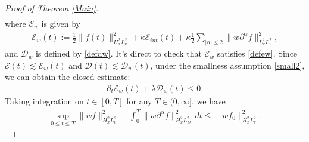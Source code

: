\documentclass[reqno,a4paper]{amsart}
\numberwithin{equation}{section}
\newcommand{\1}{\mathbf{1}}
\renewcommand{\P}{\mathbf{P}}
\newcommand{\E}{\mathcal{E}}
\newcommand{\D}{\mathcal{D}}
\newcommand{\pa}{\partial}
\newcommand{\<}{\langle}
\renewcommand{\>}{\rangle}
\newcommand{\I}{\mathbf{I}}
\renewcommand{\P}{\mathbf{P}}
\begin{document}
\begin{proof}[Proof of Theorem \ref{Main}]
\begin{align*}
\end{align*}
where $\E_w$ is given by 
\begin{align*}
	\E_w(t) := \frac{1}{2}\|f(t)\|^2_{H^2_xL^2_v} + \kappa\E_{int}(t) + \kappa\frac{1}{2}\sum_{|\alpha|\le 2}\|w\pa^\alpha f\|^2_{L^2_xL^2_v},%
\end{align*}
and $\D_w$ is defined by \eqref{defdw}. It's direct to check that $\E_w$ satisfies \eqref{defew}.
Since $\E(t)\lesssim \E_w(t)$ and $\D(t)\lesssim \D_w(t)$, under the smallness assumption \eqref{small2}, we can obtain the closed estimate:
\begin{align*}
	\partial_t\E_w(t) + \lambda \D_w(t) \le 0. 
\end{align*}
Taking integration on $t\in[0,T]$ for any $T\in(0,\infty]$, we have 
\begin{align}\label{28}
	\sup_{0\le t\le T}\|wf\|^2_{H^2_xL^2_v} + \int^T_0\|w\partial^\alpha f\|_{H^2_xL^2_D}^2\,dt\le \|wf_0\|^2_{H^2_xL^2_v}.
\end{align}


\end{proof}
\end{document}
